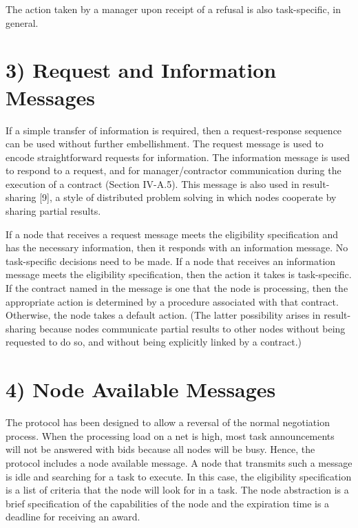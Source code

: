 \documentclass[
]{article}
\begin{document}
The action taken by a manager upon receipt of a refusal is also
task-specific, in general.

\section{3) Request and Information
Messages}\label{request-and-information-messages}

If a simple transfer of information is required, then a request-response
sequence can be used without further embellishment. The request message
is used to encode straightforward requests for information. The
information message is used to respond to a request, and for
manager/contractor communication during the execution of a contract
(Section IV-A.5). This message is also used in result-sharing {[}9{]}, a
style of distributed problem solving in which nodes cooperate by sharing
partial results.

If a node that receives a request message meets the eligibility
specification and has the necessary information, then it responds with
an information message. No task-specific decisions need to be made. If a
node that receives an information message meets the eligibility
specification, then the action it takes is task-specific. If the
contract named in the message is one that the node is processing, then
the appropriate action is determined by a procedure associated with that
contract. Otherwise, the node takes a default action. (The latter
possibility arises in result-sharing because nodes communicate partial
results to other nodes without being requested to do so, and without
being explicitly linked by a contract.)

\section{4) Node Available Messages}\label{node-available-messages}

The protocol has been designed to allow a reversal of the normal
negotiation process. When the processing load on a net is high, most
task announcements will not be answered with bids because all nodes will
be busy. Hence, the protocol includes a node available message. A node
that transmits such a message is idle and searching for a task to
execute. In this case, the eligibility specification is a list of
criteria that the node will look for in a task. The node abstraction is
a brief specification of the capabilities of the node and the expiration
time is a deadline for receiving an award.
\end{document}
